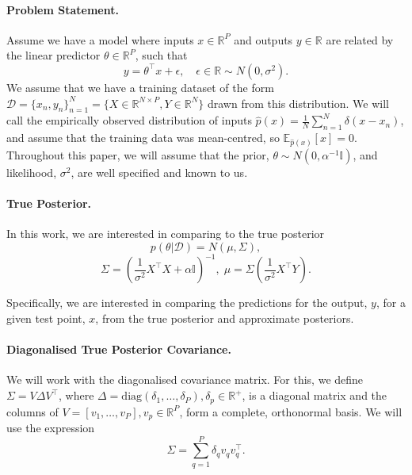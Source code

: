 \documentclass{article}
\theoremstyle{plain}
\theoremstyle{definition}
\theoremstyle{remark}
\theoremstyle{plain}
\newcommand{\R}{\mathbb{R}}
\newcommand{\expectation}[2]{\mathbb{E}_{#1}\left[#2\right]}
\newcommand{\data}{\mathcal{D}}
\newcommand{\likelihood}{\sigma^2}
\newcommand{\prior}{\alpha^{-1} \mathbb{I}}
\newcommand{\precisionprior}{\alpha \mathbb{I}}
\newcommand{\posterior}{\Sigma}
\begin{document}
\paragraph{Problem Statement.}

Assume we have a model where inputs $x\in \R^{P} $ and outputs $y\in \R$ are related by the linear predictor $\theta \in \R^P$, such that
\begin{equation} \label{eq:linear-regression}
    y =  \theta^\top x + \epsilon, \quad \epsilon \in \R \sim N(0,\likelihood ).
\end{equation}
We assume that we have a training dataset of the form $\data = \{x_n, y_n\}_{n=1}^N = \{X \in \R^{N \times P }, Y \in \R^{N}\}$ drawn from this distribution. We will call the empirically observed distribution of inputs $\hat p(x) = \frac{1}{N}\sum_{n=1}^N \delta(x-x_n)$, and assume that the training data was mean-centred, so $\expectation{\hat p(x)}{x } = 0$. Throughout this paper, we will assume that the prior, $\theta \sim N(0, \prior)$, and likelihood, $\likelihood$, are well specified and known to us.  


\paragraph{True Posterior.}

In this work, we are interested in comparing to the true posterior 
\begin{equation}\label{equ:true_post}
    p(\theta | \data) = N(\mu, \posterior), 
\end{equation}
\begin{equation*}
    \posterior = \left(\frac{1}{\likelihood}X^\top X + \precisionprior\right)^{-1}, \; \mu = \Sigma \left(\frac{1}{\likelihood}X^\top Y\right).
\end{equation*}

Specifically, we are interested in comparing the predictions for the output, $y$, for a given test point, $x$, from the true posterior and approximate posteriors. 

\paragraph{Diagonalised True Posterior Covariance.} We will work with the diagonalised covariance matrix. For this, we define $\posterior = V \Delta V^\top$, where $\Delta = \text{diag}(\delta_1, \dots, \delta_P), \delta_p \in \R^+$, is a diagonal matrix and the columns of $V = [v_1, \dots, v_P], v_p \in \R^P$, form a complete, orthonormal basis. We will use the expression 
\begin{equation}
    \posterior = \sum_{q=1}^P \delta_q v_q v_q^\top.
\end{equation}
\end{document}
